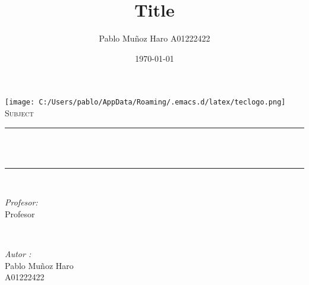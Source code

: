 \documentclass[12pt]{article}
\title{Title}
\author{Pablo Muñoz Haro A01222422}
\date{\today}
\makeatletter
\let\thetitle\@title
\makeatother
\begin{document}
\begin{titlepage}
  \centering
  \vspace*{0.5 cm}
  \texttt{[image: C:/Users/pablo/AppData/Roaming/.emacs.d/latex/teclogo.png]}\\[1.0 cm]
  \textsc{\Large Subject}\\[0.5 cm]
  \rule{\linewidth}{0.2 mm} \\[0.4 cm]
  { \huge \bfseries \thetitle}\\
  \rule{\linewidth}{0.2 mm} \\[1.5 cm]
  
  \begin{minipage}{0.4\textwidth}
    \begin{flushleft} \large
      \emph{Profesor:}\\
      Profesor\\
    \end{flushleft}
  \end{minipage}~
  \begin{minipage}{0.4\textwidth}
    
    \begin{flushright} \large
      \emph{Autor :} \\
      Pablo Muñoz Haro\\
      A01222422
    \end{flushright}
    
  \end{minipage}\\[2 cm]
  
  
\end{titlepage}


\tableofcontents
\pagebreak

\end{document}
